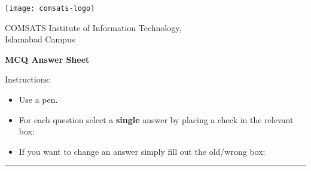 \documentclass[english,a4paper,oneside]{sdaps}
\author{}
\title{}
\begin{document}

    \hspace{7em}\texttt{[image: comsats-logo]}         %
    \vspace{-5\baselineskip}                                    %

    \begin{center}
           {COMSATS Institute of Information Technology,\\
           Islamabad Campus}

           \vspace{\baselineskip}
           {\LARGE \bfseries MCQ Answer Sheet}\\

    \end{center}

    Instructions:

        \vspace{.5\baselineskip}
        \hspace{0.025\linewidth}\begin{minipage}{0.9\linewidth}%
            \begin{itemize}
                \item Use a pen.
                \item For each question select a \textbf{single} answer by placing a check in the relevant box: \hspace{1em}\checkedbox
                \item If you want to change an answer simply fill out the old/wrong box: \hspace{1em}\correctedbox
            \end{itemize}
        \end{minipage}

    \vspace{-0.5\baselineskip}
    \begin{center}\rule{0.8\linewidth}{0.5pt}\end{center}
    \vspace{\baselineskip}
\end{document}
